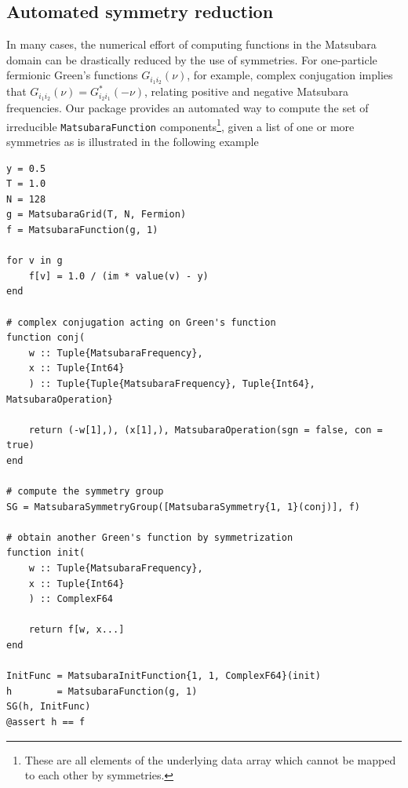 \documentclass{SciPost}
\begin{document}
\subsection{Automated symmetry reduction}
\label{subsec:symmetry}

In many cases, the numerical effort of computing functions in the Matsubara domain can be drastically reduced by the use of symmetries. For one-particle fermionic Green's functions $G_{i_1 i_2}(\nu)$, for example, complex conjugation implies that $G_{i_1 i_2}(\nu) = G^{*}_{i_2 i_1}(-\nu)$, relating positive and negative Matsubara frequencies. Our package provides an automated way to compute the set of irreducible \texttt{MatsubaraFunction} components\footnote{ These are all elements of the underlying data array which cannot be mapped to each other by symmetries.}, given a list of one or more symmetries as is illustrated in the following example
%
\begin{verbatim}
y = 0.5
T = 1.0
N = 128
g = MatsubaraGrid(T, N, Fermion)
f = MatsubaraFunction(g, 1)

for v in g
    f[v] = 1.0 / (im * value(v) - y)
end 

# complex conjugation acting on Green's function
function conj(
    w :: Tuple{MatsubaraFrequency},
    x :: Tuple{Int64}
    ) :: Tuple{Tuple{MatsubaraFrequency}, Tuple{Int64}, MatsubaraOperation}

    return (-w[1],), (x[1],), MatsubaraOperation(sgn = false, con = true)
end 

# compute the symmetry group 
SG = MatsubaraSymmetryGroup([MatsubaraSymmetry{1, 1}(conj)], f)

# obtain another Green's function by symmetrization
function init(
    w :: Tuple{MatsubaraFrequency},
    x :: Tuple{Int64}
    ) :: ComplexF64

    return f[w, x...]
end 

InitFunc = MatsubaraInitFunction{1, 1, ComplexF64}(init)
h        = MatsubaraFunction(g, 1)
SG(h, InitFunc)
@assert h == f
\end{verbatim}
%
\end{document}
